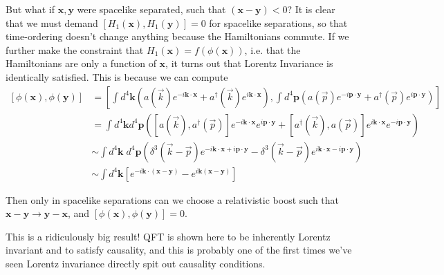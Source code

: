 \documentclass[12pt]{article}
\begin{document}
But what if $\mathbf{x}, \mathbf{y}$ were spacelike separated, such that $(\mathbf{x} - \mathbf{y}) < 0$? It is clear that we must demand $\left[ H_1(\mathbf{x}), H_1(\mathbf{y}) \right] = 0$ for spacelike separations, so that time-ordering doesn't change anything because the Hamiltonians commute. If we further make the constraint that $H_1(\mathbf{x}) = f(\phi(\mathbf{x}))$, i.e. that the Hamiltonians are only a function of $\mathbf{x}$, it turns out that Lorentz Invariance is identically satisfied. This is because we can compute
\begin{align}
    \left[ \phi(\mathbf{x}), \phi(\mathbf{y}) \right] &= \left[ \int d^4\mathbf{k}\left( a(\vec{k})e^{-i\mathbf{k} \cdot \mathbf{x}} + a^\dagger(\vec{k})e^{i\mathbf{k}\cdot\mathbf{x}} \right), \int d^4\mathbf{p}\left( a(\vec{p})e^{-i\mathbf{p} \cdot \mathbf{y}} + a^\dagger(\vec{p})e^{i\mathbf{p} \cdot\mathbf{y}} \right) \right]\\
    &= \int d^4\mathbf{k} d^4\mathbf{p}\left( \left[ a(\vec{k}), a^\dagger(\vec{p}) \right]e^{-i\mathbf{k} \cdot \mathbf{x}}e^{i\mathbf{p} \cdot \mathbf{y}} + \left[ a^\dagger(\vec{k}),a(\vec{p}) \right]e^{i\mathbf{k} \cdot\mathbf{x}}e^{-i\mathbf{p} \cdot \mathbf{y}} \right)\\
    &\sim \int d^4\mathbf{k}\; d^4\mathbf{p}\left( \delta^3(\vec{k} - \vec{p})e^{-i\mathbf{k} \cdot \mathbf{x} + i\mathbf{p} \cdot \mathbf{y}} - \delta^3(\vec{k} - \vec{p}) e^{i\mathbf{k} \cdot \mathbf{x} - i\mathbf{p} \cdot \mathbf{y}} \right)\\
    &\sim \int d^4\mathbf{k}\left[ e^{-i\mathbf{k} \cdot \left( \mathbf{x} -\mathbf{y} \right)} - e^{i\mathbf{k}\left( \mathbf{x}-\mathbf{y} \right)} \right]
\end{align}

Then only in spacelike separations can we choose a relativistic boost such that $\mathbf{x} - \mathbf{y} \to \mathbf{y} - \mathbf{x}$, and $\left[ \phi(\mathbf{x}), \phi(\mathbf{y}) \right] = 0$.

This is a ridiculously big result! QFT is shown here to be inherently Lorentz invariant and to satisfy causality, and this is probably one of the first times we've seen Lorentz invariance directly spit out causality conditions.
\end{document}
